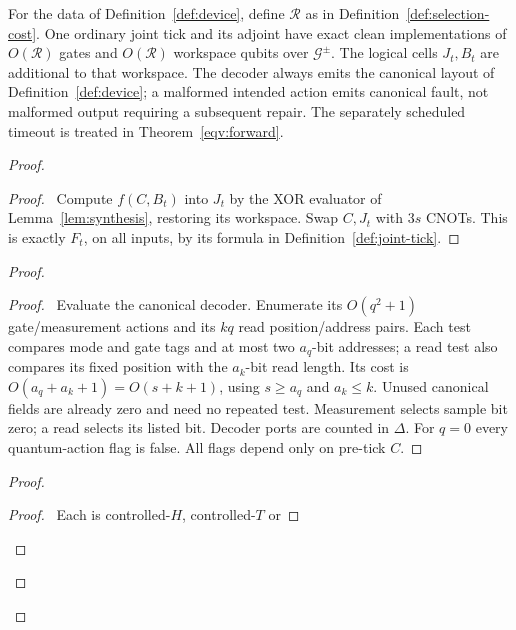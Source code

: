 \begin{lemma}\label{eqv:tick-cost}
For the data of Definition~\ref{def:device}, define $\mathcal R$ as in
Definition~\ref{def:selection-cost}. One ordinary joint tick and its adjoint have exact
clean implementations of $O(\mathcal R)$ gates and $O(\mathcal R)$
workspace qubits over $\mathcal G^{\pm}$. The logical cells $J_t,B_t$
are additional to that workspace. The decoder always emits the canonical
layout of Definition~\ref{def:device}; a malformed intended action emits
canonical fault, not malformed output requiring a subsequent repair.
The separately scheduled timeout is treated in Theorem~\ref{eqv:forward}.
\end{lemma}
\begin{proof}
 \begin{proof}\pf\ Compute $f(C,B_t)$ into $J_t$ by the XOR evaluator
 of Lemma~\ref{lem:synthesis}, restoring its workspace. Swap $C,J_t$
 with $3s$ CNOTs. This is exactly $F_t$, on all inputs, by its formula
 in Definition~\ref{def:joint-tick}.\end{proof}
 \begin{proof}
  \begin{proof}\pf\ Evaluate the canonical decoder. Enumerate its
  $O(q^2+1)$ gate/measurement actions and its $kq$ read
  position/address pairs. Each test compares mode and gate tags and
  at most two $a_q$-bit addresses; a read test also compares its
  fixed position with the $a_k$-bit read length. Its cost is
  $O(a_q+a_k+1)=O(s+k+1)$, using $s\geq a_q$ and $a_k\leq k$.
  Unused canonical fields are already zero and need no repeated test.
  Measurement selects sample bit zero; a read selects its listed bit.
  Decoder ports are counted in $\Delta$. For $q=0$ every
  quantum-action flag is false. All flags depend only on pre-tick $C$.
  \end{proof}
\begin{proof}
 \begin{proof}\pf\ Each is controlled-$H$, controlled-$T$ or

\end{proof}
\end{proof}
\end{proof}
\end{proof}

